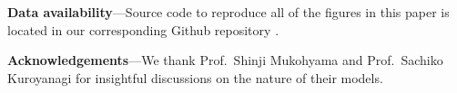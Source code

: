 \documentclass[prd,twocolumn,aps,psfig,nofootinbib,nobibnotes,superscriptaddress,preprintnumbers,times]{revtex4-2}
\begin{document}
\vspace{2mm}
{\bf Data availability}---Source code to reproduce all of the figures in this paper is located in our corresponding Github repository \cite{GH}. 
\vspace{2mm}

{\bf Acknowledgements}---We thank Prof.\ Shinji Mukohyama and Prof.\ Sachiko Kuroyanagi for insightful discussions on the nature of their models.




\clearpage
\end{document}

